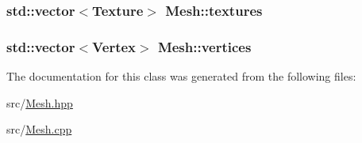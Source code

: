 \subsubsection[{\texorpdfstring{textures}{textures}}]{\setlength{\rightskip}{0pt plus 5cm}std\+::vector$<${\bf Texture}$>$ Mesh\+::textures}\hypertarget{classMesh_abf1e672703bf4f8e104f3b076faaf958}{}\label{classMesh_abf1e672703bf4f8e104f3b076faaf958}
\subsubsection[{\texorpdfstring{vertices}{vertices}}]{\setlength{\rightskip}{0pt plus 5cm}std\+::vector$<${\bf Vertex}$>$ Mesh\+::vertices}\hypertarget{classMesh_a6465a888c97232a39e12aad008c969c3}{}\label{classMesh_a6465a888c97232a39e12aad008c969c3}


The documentation for this class was generated from the following files\+:\begin{DoxyCompactItemize}
\item 
src/\hyperlink{Mesh_8hpp}{Mesh.\+hpp}\item 
src/\hyperlink{Mesh_8cpp}{Mesh.\+cpp}\end{DoxyCompactItemize}
